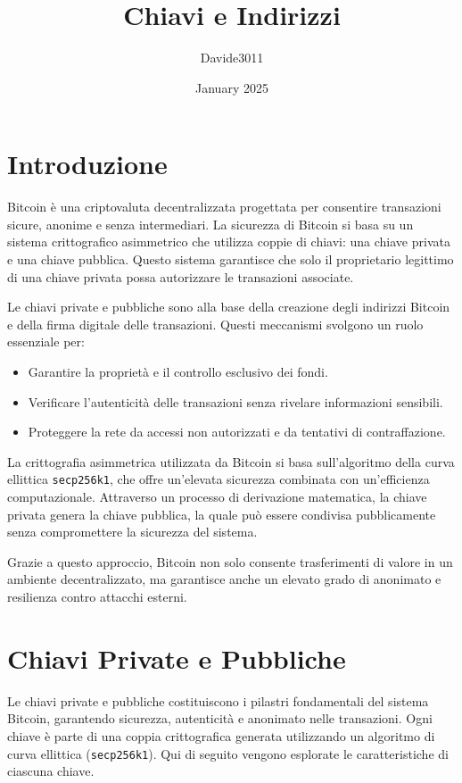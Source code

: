 \documentclass{article}
\title{Chiavi e Indirizzi}
\author{Davide3011}
\date{January 2025}
\begin{document}
\maketitle

\section{Introduzione}
Bitcoin è una criptovaluta decentralizzata progettata per consentire transazioni sicure, anonime e senza intermediari. La sicurezza di Bitcoin si basa su un sistema crittografico asimmetrico che utilizza coppie di chiavi: una chiave privata e una chiave pubblica. Questo sistema garantisce che solo il proprietario legittimo di una chiave privata possa autorizzare le transazioni associate.

Le chiavi private e pubbliche sono alla base della creazione degli indirizzi Bitcoin e della firma digitale delle transazioni. Questi meccanismi svolgono un ruolo essenziale per:
\begin{itemize}
    \item Garantire la proprietà e il controllo esclusivo dei fondi.
    \item Verificare l'autenticità delle transazioni senza rivelare informazioni sensibili.
    \item Proteggere la rete da accessi non autorizzati e da tentativi di contraffazione.
\end{itemize}

La crittografia asimmetrica utilizzata da Bitcoin si basa sull'algoritmo della curva ellittica \texttt{secp256k1}, che offre un'elevata sicurezza combinata con un'efficienza computazionale. Attraverso un processo di derivazione matematica, la chiave privata genera la chiave pubblica, la quale può essere condivisa pubblicamente senza compromettere la sicurezza del sistema.

Grazie a questo approccio, Bitcoin non solo consente trasferimenti di valore in un ambiente decentralizzato, ma garantisce anche un elevato grado di anonimato e resilienza contro attacchi esterni.


\section{Chiavi Private e Pubbliche}
Le chiavi private e pubbliche costituiscono i pilastri fondamentali del sistema Bitcoin, garantendo sicurezza, autenticità e anonimato nelle transazioni. Ogni chiave è parte di una coppia crittografica generata utilizzando un algoritmo di curva ellittica (\texttt{secp256k1}). Qui di seguito vengono esplorate le caratteristiche di ciascuna chiave.
\end{document}
